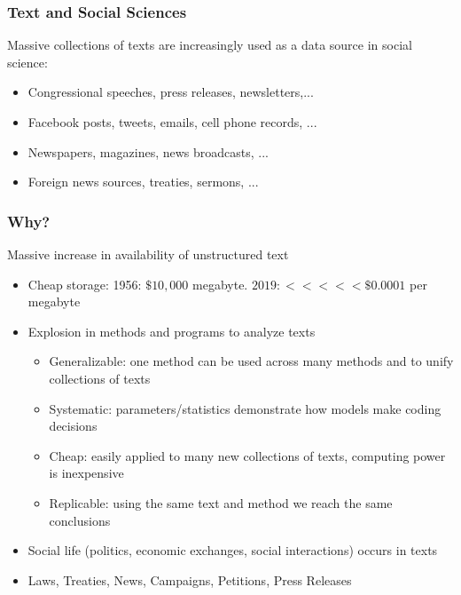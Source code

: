 \documentclass[compress, aspectratio=54]{beamer}
\begin{document}


\begin{frame}
\frametitle{Text and Social Sciences}
Massive collections of texts are increasingly used as a data source in social
science:
\begin{itemize}
\item Congressional speeches, press releases, newsletters,...
\item Facebook posts, tweets, emails, cell phone records, ...
\item Newspapers, magazines, news broadcasts, ...
\item Foreign news sources, treaties, sermons, ...

\end{itemize}
\end{frame}




\begin{frame}
\frametitle{Why?}
Massive increase in availability of unstructured text
\begin{itemize}
\item Cheap storage: 1956: $\$10,000 $ megabyte. $2019: <<<<< \$0.0001$ per megabyte
\item Explosion in methods and programs to analyze texts

\begin{itemize}
\item Generalizable: one method can be used across many methods and to
unify collections of texts
\item Systematic: parameters/statistics demonstrate how models make
coding decisions
\item Cheap: easily applied to many new collections of texts, computing
power is inexpensive
\item Replicable: using the same text and method we reach the same conclusions
\end{itemize}
\item  Social life (politics, economic exchanges, social interactions)
occurs in texts
\end{itemize}
\begin{itemize}
\item Laws, Treaties, News, Campaigns, Petitions, Press Releases
\end{itemize}
\end{frame}
\end{document}
